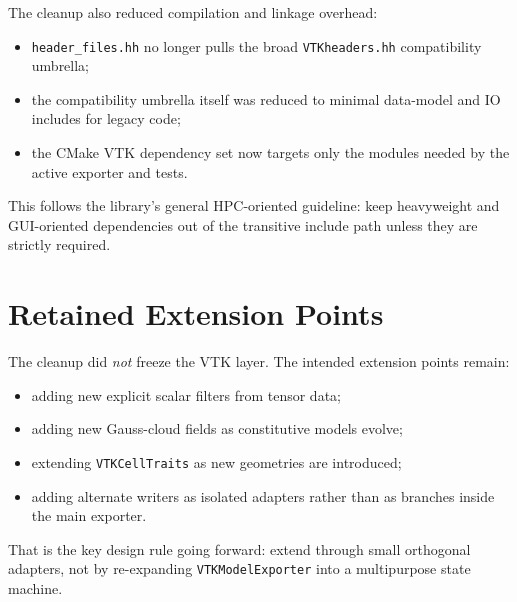 The cleanup also reduced compilation and linkage overhead:
\begin{itemize}[nosep]
  \item \texttt{header\_files.hh} no longer pulls the broad
        \texttt{VTKheaders.hh} compatibility umbrella;
  \item the compatibility umbrella itself was reduced to minimal data-model and
        IO includes for legacy code;
  \item the CMake VTK dependency set now targets only the modules needed by the
        active exporter and tests.
\end{itemize}

This follows the library's general HPC-oriented guideline: keep heavyweight and
GUI-oriented dependencies out of the transitive include path unless they are
strictly required.


\section{Retained Extension Points}
\label{sec:vtk_cleanup_extensions}

The cleanup did \emph{not} freeze the VTK layer.  The intended extension points
remain:
\begin{itemize}[nosep]
  \item adding new explicit scalar filters from tensor data;
  \item adding new Gauss-cloud fields as constitutive models evolve;
  \item extending \texttt{VTKCellTraits} as new geometries are introduced;
  \item adding alternate writers as isolated adapters rather than as branches
        inside the main exporter.
\end{itemize}

That is the key design rule going forward: extend through small orthogonal
adapters, not by re-expanding \texttt{VTKModelExporter} into a multipurpose
state machine.

